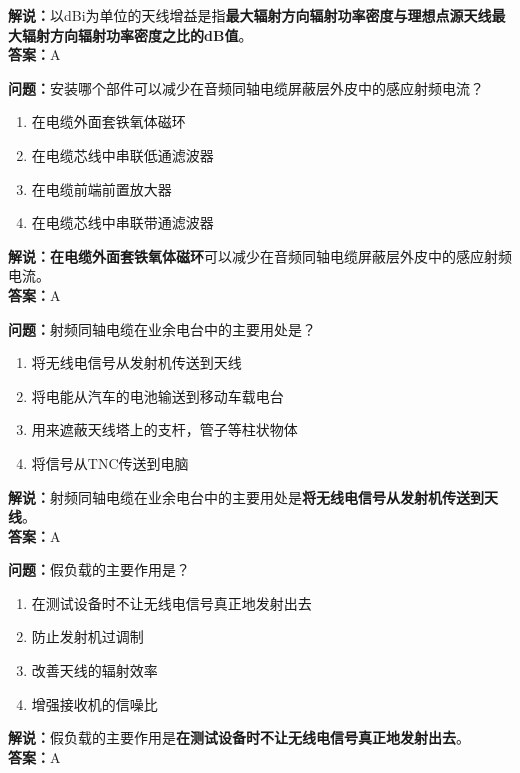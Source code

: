 \textbf{解说：}以dBi为单位的天线增益是指\textbf{最大辐射方向辐射功率密度与理想点源天线最大辐射方向辐射功率密度之比的dB值}。\\\textbf{答案：}A



\textbf{问题：}安装哪个部件可以减少在音频同轴电缆屏蔽层外皮中的感应射频电流？

\begin{enumerate}[label=\Alph*), leftmargin=1cm]
	\item 在电缆外面套铁氧体磁环
	\item 在电缆芯线中串联低通滤波器
	\item 在电缆前端前置放大器
	\item 在电缆芯线中串联带通滤波器
\end{enumerate}

\textbf{解说：}\textbf{在电缆外面套铁氧体磁环}可以减少在音频同轴电缆屏蔽层外皮中的感应射频电流。\\\textbf{答案：}A



\textbf{问题：}射频同轴电缆在业余电台中的主要用处是？

\begin{enumerate}[label=\Alph*), leftmargin=1cm]
	\item 将无线电信号从发射机传送到天线
	\item 将电能从汽车的电池输送到移动车载电台
	\item 用来遮蔽天线塔上的支杆，管子等柱状物体
	\item 将信号从TNC传送到电脑
\end{enumerate}

\textbf{解说：}射频同轴电缆在业余电台中的主要用处是\textbf{将无线电信号从发射机传送到天线}。\\\textbf{答案：}A



\textbf{问题：}假负载的主要作用是？

\begin{enumerate}[label=\Alph*), leftmargin=1cm]
	\item 在测试设备时不让无线电信号真正地发射出去
	\item 防止发射机过调制
	\item 改善天线的辐射效率
	\item 增强接收机的信噪比
\end{enumerate}

\textbf{解说：}假负载的主要作用是\textbf{在测试设备时不让无线电信号真正地发射出去}。\\\textbf{答案：}A



